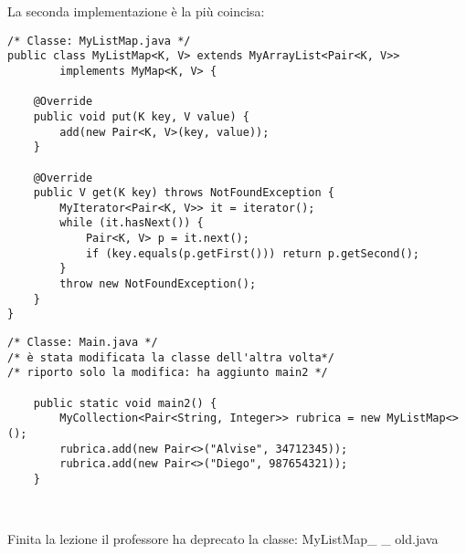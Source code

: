 \noindent La seconda implementazione è la più coincisa:

\begin{lstlisting}[basicstyle=\small,]
/* Classe: MyListMap.java */
public class MyListMap<K, V> extends MyArrayList<Pair<K, V>>
        implements MyMap<K, V> {

    @Override
    public void put(K key, V value) {
        add(new Pair<K, V>(key, value));
    }

    @Override
    public V get(K key) throws NotFoundException {
        MyIterator<Pair<K, V>> it = iterator();
        while (it.hasNext()) {
            Pair<K, V> p = it.next();
            if (key.equals(p.getFirst())) return p.getSecond();
        }
        throw new NotFoundException();
    }
}
\end{lstlisting}

\begin{lstlisting}[basicstyle=\small,]
/* Classe: Main.java */
/* è stata modificata la classe dell'altra volta*/
/* riporto solo la modifica: ha aggiunto main2 */

    public static void main2() {
        MyCollection<Pair<String, Integer>> rubrica = new MyListMap<>();
        rubrica.add(new Pair<>("Alvise", 34712345));
        rubrica.add(new Pair<>("Diego", 987654321));
    }



\end{lstlisting}

\noindent Finita la lezione il professore ha deprecato la classe: MyListMap\_ \_ old.java